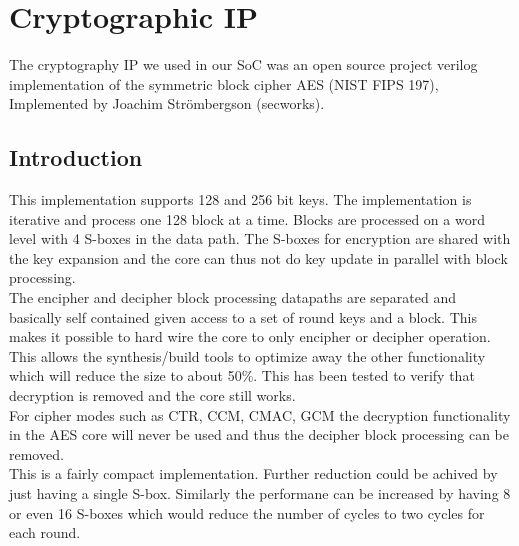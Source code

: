 \documentclass[../main.tex]{subfiles}
\begin{document}
\section{Cryptographic IP}
The cryptography IP we used in our SoC was an open source project verilog implementation of the symmetric block cipher AES (NIST FIPS 197), Implemented by Joachim Strömbergson (secworks).\\
\subsection*{Introduction}
This implementation supports 128 and 256 bit keys. The implementation is iterative and process one 128 block at a time. Blocks are processed on a word level with 4 S-boxes in the data path. The S-boxes for encryption are shared with the key expansion and the core can thus not do key update in parallel with block processing.\\
The encipher and decipher block processing datapaths are separated and basically self contained given access to a set of round keys and a block. This makes it possible to hard wire the core to only encipher or decipher operation. This allows the synthesis/build tools to optimize away the other functionality which will reduce the size to about 50\%. This has been tested to verify that decryption is removed and the core still works.\\
For cipher modes such as CTR, CCM, CMAC, GCM the decryption functionality in the AES core will never be used and thus the decipher block processing can be removed.\\
This is a fairly compact implementation. Further reduction could be achived by just having a single S-box. Similarly the performane can be increased by having 8 or even 16 S-boxes which would reduce the number of cycles to two cycles for each round.\\
\end{document}
